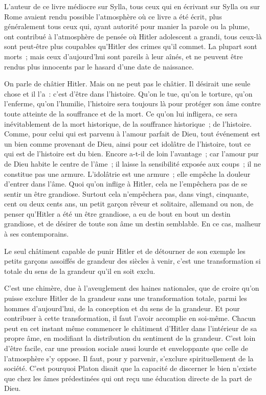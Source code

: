\documentclass[french,twoside]{book} %
\begin{document}
L'auteur de ce livre médiocre sur Sylla, tous ceux qui en écrivant sur Sylla ou sur Rome avaient rendu possible l'atmosphère où ce livre a été écrit, plus généralement tous ceux qui, ayant autorité pour manier la parole ou la plume, ont contribué à l'atmosphère de pensée où Hitler adolescent a grandi, tous ceux-là sont peut-être plus coupables qu'Hitler des crimes qu'il commet. La plupart sont morts ; mais ceux d'aujourd'hui sont pareils à leur aînés, et ne peuvent être rendus plus innocents par le hasard d'une date de naissance.\par
On parle de châtier Hitler. Mais on ne peut pas le châtier. Il désirait une seule chose et il l’a : c'est d'être dans l'histoire. Qu'on le tue, qu'on le torture, qu'on l'enferme, qu'on l'humilie, l'histoire sera toujours là pour protéger son âme contre toute atteinte de la souffrance et de la mort. Ce qu'on lui infligera, ce sera inévitablement de la mort historique, de la souffrance historique ; de l'histoire. Comme, pour celui qui est parvenu à l'amour parfait de Dieu, tout événement est un bien comme provenant de Dieu, ainsi pour cet idolâtre de l'histoire, tout ce qui est de l'histoire est du bien. Encore a-t-il de loin l'avantage ; car l'amour pur de Dieu habite le centre de l'âme ; il laisse la sensibilité exposée aux coups ; il ne constitue pas une armure. L'idolâtrie est une armure ; elle empêche la douleur d'entrer dans l'âme. Quoi qu'on inflige à Hitler, cela ne l'empêchera pas de se sentir un être grandiose. Surtout cela n'empêchera pas, dans vingt, cinquante, cent ou deux cents ans, un petit garçon rêveur et solitaire, allemand ou non, de penser qu'Hitler a été un être grandiose, a eu de bout en bout un destin grandiose, et de désirer de toute son âme un destin semblable. En ce cas, malheur à ses contemporains.\par
Le seul châtiment capable de punir Hitler et de détourner de son exemple les petits garçons assoiffés de grandeur des siècles à venir, c'est une transformation si totale du sens de la grandeur qu'il en soit exclu.\par
C'est une chimère, due à l'aveuglement des haines nationales, que de croire qu'on puisse exclure Hitler de la grandeur sans une transformation totale, parmi les hommes d'aujourd'hui, de la conception et du sens de la grandeur. Et pour contribuer à cette transformation, il faut l'avoir accomplie en soi-même. Chacun peut en cet instant même commencer le châtiment d'Hitler dans l'intérieur de sa propre âme, en modifiant la distribution du sentiment de la grandeur. C'est loin d'être facile, car une pression sociale aussi lourde et enveloppante que celle de l'atmosphère s'y oppose. Il faut, pour y parvenir, s'exclure spirituellement de la société. C'est pourquoi Platon disait que la capacité de discerner le bien n'existe que chez les âmes prédestinées qui ont reçu une éducation directe de la part de Dieu.\par
\end{document}
